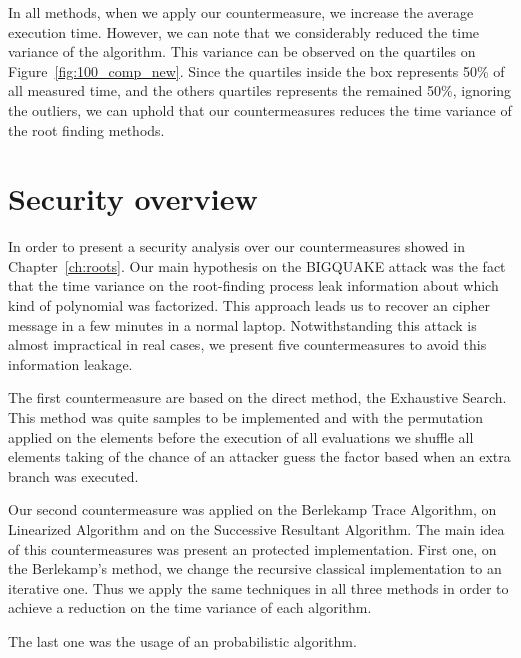 

In all methods, when we apply our countermeasure, we increase the average execution time. However, we can note that we considerably reduced the time variance of the algorithm. This variance can be observed on the quartiles on Figure~\ref{fig:100_comp_new}. Since the quartiles inside the box represents 50\% of all measured time, and the others quartiles represents the remained 50\%, ignoring the outliers, we can uphold that our countermeasures reduces the time variance of the root finding methods. 

\section{Security overview}
In order to present a security analysis over our countermeasures showed in Chapter~\ref{ch:roots}. Our main hypothesis on the BIGQUAKE attack was the fact that the time variance on the root-finding process leak information about which kind of polynomial was factorized. This approach leads us to recover an cipher message in a few minutes in a normal laptop. Notwithstanding this attack is almost impractical in real cases, we present five countermeasures to avoid this information leakage.

The first countermeasure are based on the direct method, the Exhaustive Search. This method was quite samples to be implemented and with the permutation applied on the elements before the execution of all evaluations we shuffle all elements taking of the chance of an attacker guess the factor based when an extra branch was executed.

Our second countermeasure was applied on the Berlekamp Trace Algorithm, on Linearized Algorithm and on the Successive Resultant Algorithm. The main idea of this countermeasures was present an protected implementation. First one, on the Berlekamp's method, we change the recursive classical implementation to an iterative one. Thus we apply the same techniques in all three methods in order to achieve a reduction on the time variance of each algorithm.

The last one was the usage of an probabilistic algorithm. 




